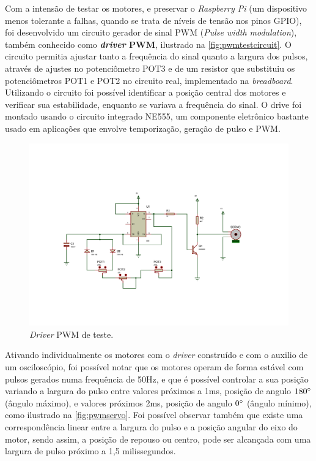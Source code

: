 Com a intensão de testar os motores, e preservar o \textit{Raspberry Pi} (um dispositivo menos tolerante a falhas, quando se trata de níveis de tensão nos pinos GPIO), foi desenvolvido um circuito gerador de sinal PWM (\textit{Pulse width modulation}), também conhecido como \textbf{\textit{driver} PWM}, ilustrado na \autoref{fig:pwmtestcircuit}. O circuito permitia ajustar tanto a frequência do sinal quanto a largura dos pulsos, através de ajustes no potenciômetro POT3 e de um resistor que substituiu os potenciômetros POT1 e POT2 no circuito real, implementado na \textit{breadboard}. Utilizando o circuito foi possível identificar a posição central dos motores e verificar sua estabilidade, enquanto se variava a frequência do sinal. O drive foi montado usando o circuito integrado NE555, um componente eletrônico bastante usado em aplicações que envolve temporização, geração de pulso e PWM. \par

\begin{figure}[H]
	\centering
	\includegraphics[trim={2.5cm 3cm 4cm 5cm},clip,width=1\textwidth]{figuras/pwm2.pdf}
	\caption{\textit{Driver} PWM de teste.}
	\label{fig:pwmtestcircuit}
\end{figure}

Ativando individualmente os motores com o \textit{driver} construído e com o auxilio de um osciloscópio, foi possível notar que os motores operam de forma estável com pulsos gerados numa frequência de 50Hz, e que é possível controlar a sua posição variando a largura do pulso entre valores próximos a 1ms, posição de angulo $180\degree$ (ângulo máximo), e valores próximos 2ms, posição de angulo $0\degree$ (ângulo mínimo), como ilustrado na \autoref{fig:pwmservo}. Foi possível observar também que existe uma correspondência linear entre a largura do pulso e a posição angular do eixo do motor, sendo assim, a posição de repouso ou centro, pode ser alcançada com uma largura de pulso próximo a 1,5 milissegundos. 

